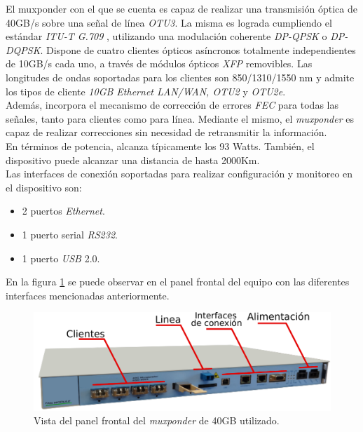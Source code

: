 El muxponder con el que se cuenta es capaz de realizar una transmisión óptica de 40GB/s sobre una señal de línea \textit{OTU3}. La misma es lograda cumpliendo el estándar \textit{ITU-T G.709} \parencite{itu7}, utilizando una modulación coherente \textit{DP-QPSK} o \textit{DP-DQPSK}.
Dispone de cuatro clientes ópticos asíncronos totalmente independientes de 10GB/s cada uno, a través de módulos ópticos  \textit{XFP} removibles. Las longitudes de ondas soportadas para los clientes son 850/1310/1550 nm y admite los tipos de cliente \textit{10GB Ethernet LAN/WAN, OTU2} y \textit{OTU2e}.
\\

Además, incorpora el mecanismo de corrección de errores \textit{FEC} para todas las señales, tanto para clientes como para línea. Mediante el mismo, el \textit{muxponder} es capaz de realizar correcciones sin necesidad de retransmitir la información.
\\

En términos de potencia, alcanza típicamente los 93 Watts. También, el dispositivo puede alcanzar una distancia de hasta 2000Km.
\\

Las interfaces de conexión soportadas para realizar configuración y monitoreo en el dispositivo son: 
\begin{itemize}
	\item 2 puertos \textit{Ethernet}.
	\item 1 puerto serial \textit{RS232}.
	\item 1 puerto \textit{USB} 2.0.
\end{itemize}

En la figura \ref{fig:mux40} se puede observar en el panel frontal del equipo con las diferentes interfaces mencionadas anteriormente.


\begin{figure}[H]
	\centering
	\includegraphics[scale=0.7]{Figures/mux40.pdf}
	\caption{Vista del panel frontal del \textit{muxponder} de 40GB utilizado.}
	\label{fig:mux40}
  \end{figure}


